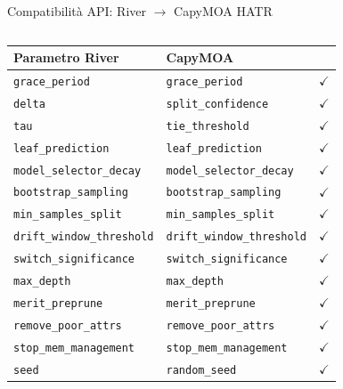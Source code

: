 \documentclass[aspectratio=169,10pt]{beamer}
\begin{document}
\begin{frame}{Compatibilità API: River $\to$ CapyMOA HATR}
  \vspace{-0.3em}
  \footnotesize
  \begin{columns}[T]
    \begin{tabular}{@{}ll@{\;}c@{}}
      \toprule
      \textbf{Parametro River} & \textbf{CapyMOA} & \\
      \midrule
      \texttt{grace\_period}            & \texttt{grace\_period}            & \textcolor{adwingreen}{$\checkmark$} \\
      \texttt{delta}                    & \texttt{split\_confidence}        & \textcolor{adwingreen}{$\checkmark$} \\
      \texttt{tau}                      & \texttt{tie\_threshold}           & \textcolor{adwingreen}{$\checkmark$} \\
      \texttt{leaf\_prediction}         & \texttt{leaf\_prediction}         & \textcolor{adwingreen}{$\checkmark$} \\
      \texttt{model\_selector\_decay}   & \texttt{model\_selector\_decay}   & \textcolor{adwingreen}{$\checkmark$} \\
      \texttt{bootstrap\_sampling}      & \texttt{bootstrap\_sampling}      & \textcolor{adwingreen}{$\checkmark$} \\
      \texttt{min\_samples\_split}      & \texttt{min\_samples\_split}      & \textcolor{adwingreen}{$\checkmark$} \\
      \texttt{drift\_window\_threshold} & \texttt{drift\_window\_threshold} & \textcolor{adwingreen}{$\checkmark$} \\
      \texttt{switch\_significance}     & \texttt{switch\_significance}     & \textcolor{adwingreen}{$\checkmark$} \\
      \texttt{max\_depth}               & \texttt{max\_depth}               & \textcolor{adwingreen}{$\checkmark$} \\
      \texttt{merit\_preprune}          & \texttt{merit\_preprune}          & \textcolor{adwingreen}{$\checkmark$} \\
      \texttt{remove\_poor\_attrs}      & \texttt{remove\_poor\_attrs}      & \textcolor{adwingreen}{$\checkmark$} \\
      \texttt{stop\_mem\_management}    & \texttt{stop\_mem\_management}    & \textcolor{adwingreen}{$\checkmark$} \\
      \texttt{seed}                     & \texttt{random\_seed}             & \textcolor{adwingreen}{$\checkmark$} \\
      \bottomrule
    \end{tabular}


\end{columns}
\end{frame}
\end{document}
